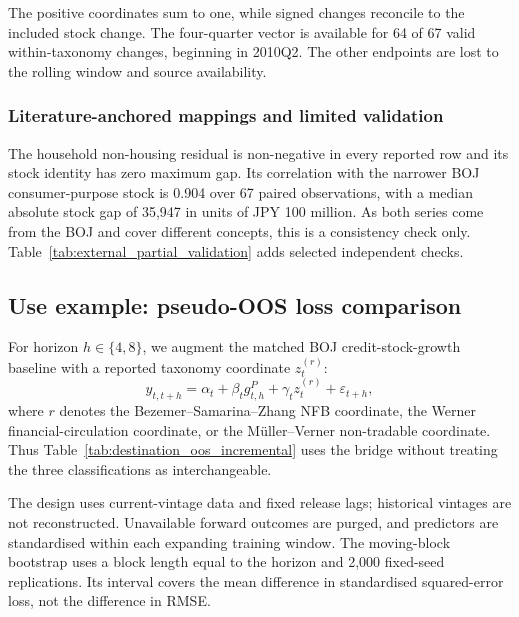 \documentclass[11pt]{article}
\begin{document}
The positive coordinates sum to one, while signed changes reconcile to the
included stock change. The four-quarter vector is available for 64 of 67 valid
within-taxonomy changes, beginning in 2010Q2. The other endpoints are lost to
the rolling window and source availability.

\subsubsection{Literature-anchored mappings and limited validation}

The household non-housing residual is non-negative in every reported row and
its stock identity has zero maximum gap. Its correlation with the narrower BOJ
consumer-purpose stock is 0.904 over 67 paired observations, with a median
absolute stock gap of 35,947 in units of JPY 100 million. As both series come
from the BOJ and cover different concepts, this is a consistency check only.
Table~\ref{tab:external_partial_validation} adds selected independent checks.

\subsection{Use example: pseudo-OOS loss comparison}

For horizon \(h\in\{4,8\}\), we augment the matched BOJ credit-stock-growth
baseline with a reported taxonomy coordinate \(z_t^{(r)}\):
\begin{equation}
  y_{t,t+h}
    =\alpha_t+\beta_t g_{t,h}^P+\gamma_t z_t^{(r)}
     +\varepsilon_{t+h},
  \label{eq:oos_application}
\end{equation}
where \(r\) denotes the Bezemer--Samarina--Zhang NFB coordinate, the Werner
financial-circulation coordinate, or the M\"uller--Verner non-tradable
coordinate. Thus Table~\ref{tab:destination_oos_incremental} uses the bridge
without treating the three classifications as interchangeable.

The design uses current-vintage data and fixed release lags; historical
vintages are not reconstructed. Unavailable forward outcomes are purged, and
predictors are standardised within each expanding training window. The
moving-block bootstrap uses a block length equal to the horizon and 2,000
fixed-seed replications. Its interval covers the mean difference in
standardised squared-error loss, not the difference in RMSE.

\end{document}
